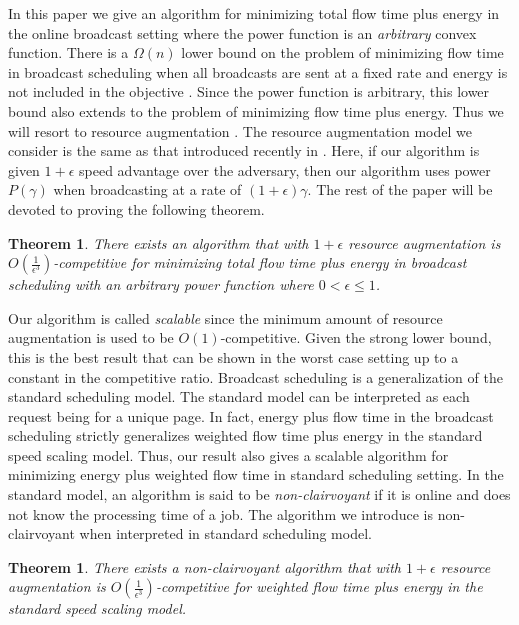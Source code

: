 \documentclass[11pt]{article}
\newtheorem{theorem}[lemma]{Theorem}
\newcommand{\eps}{\epsilon}
\begin{document}
  In this paper we give an algorithm for minimizing total flow time plus energy in the online broadcast setting where the power function is an \emph{arbitrary} convex function.  There is a $\Omega(n)$ lower bound on the problem of minimizing  flow time in broadcast scheduling when all broadcasts are sent at a fixed rate and energy is not included in the objective \cite{KalyanasundaramPV00}. Since the power function is arbitrary, this lower bound also extends to the problem of minimizing flow time plus energy.  Thus we will resort to resource augmentation \cite{KalyanasundaramP95}.  The resource augmentation model we consider is the same as that introduced recently in \cite{GuptaKP10}.  Here, if our algorithm is given $1+\eps$ speed advantage over the adversary, then our algorithm uses power $P(\gamma)$ when broadcasting at a rate of $(1+\eps)\gamma$.  The rest of the paper will be devoted to proving the following theorem.

\begin{theorem}
\label{thm:main}
There exists an algorithm that with $1+\eps$ resource augmentation is $O(\frac{1}{\eps^3})$-competitive for minimizing total flow time plus energy in broadcast scheduling with an arbitrary power function where $0 <\eps \leq 1$. 
\end{theorem}

Our algorithm is called \emph{scalable} since the minimum amount of resource augmentation is used to be $O(1)$-competitive. Given the strong lower bound, this is the best result that can be shown in the worst case setting up to a constant in the competitive ratio. Broadcast scheduling is a generalization of the standard scheduling model.  The standard model can be interpreted as each request being for a unique page.  In fact, energy plus flow time in the broadcast scheduling strictly generalizes weighted flow time plus energy in the standard speed scaling model.  Thus, our result also gives a scalable algorithm for minimizing energy plus weighted flow time  in standard scheduling setting.  In the standard model, an algorithm is said to be \emph{non-clairvoyant} if it is online and does not know the processing time of a job.    The algorithm we introduce is non-clairvoyant when interpreted in standard scheduling model.

\begin{theorem}\label{thm:non}
There exists a non-clairvoyant algorithm that with $1+\eps$ resource augmentation is $O(\frac{1}{\eps^3})$-competitive  for weighted flow time plus energy in the standard speed scaling model.
\end{theorem}
\end{document}
